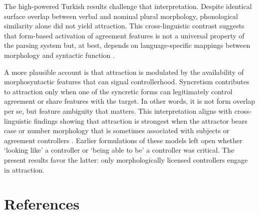 \documentclass[
  authoryear,
  3p]{elsarticle}
\begin{document}
The high-powered Turkish results challenge that interpretation. Despite
identical surface overlap between verbal and nominal plural morphology,
phonological similarity alone did not yield attraction. This
cross-linguistic contrast suggests that form-based activation of
agreement features is not a universal property of the parsing system
but, at best, depends on language-specific mappings between morphology
and syntactic function \citep{DillonKeshev2024}.

A more plausible account is that attraction is modulated by the
availability of morphosyntactic features that can signal controllerhood.
Syncretism contributes to attraction only when one of the syncretic
forms can legitimately control agreement or share features with the
target. In other words, it is not form overlap per se, but feature
ambiguity that matters. This interpretation aligns with cross-linguistic
findings showing that attraction is strongest when the attractor bears
case or number morphology that is sometimes associated with subjects or
agreement controllers
\citep{LagoEtAl2019, BhatiaDillon2022, BleotuDillon2024, HartsuikerEtAl2003}.
Earlier formulations of these models left open whether `looking like' a
controller or `being able to be' a controller was critical. The present
results favor the latter: only morphologically licensed controllers
engage in attraction.

\section*{References}\label{references}

\newcommand{\doi}[1]{\href{http://dx.doi.org/#1}{http://dx.doi.org/#1}}
\begingroup
\raggedright
\singlespacing

\renewcommand{\bibsection}{}


\endgroup
\end{document}

